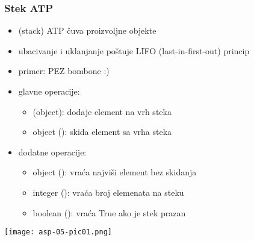 \documentclass[compress,aspectratio=169]{beamer}
\begin{document}
\begin{frame}[fragile]
  \frametitle{Stek ATP}
  \begin{itemize}
    \item {} (stack) ATP čuva proizvoljne objekte
    \item ubacivanje i uklanjanje poštuje LIFO (last-in-first-out) princip
    \item primer: PEZ bombone :)
    \item glavne operacije:
    \begin{itemize}
      \item {}(object): dodaje element na vrh steka
      \item object (): skida element sa vrha steka
    \end{itemize}
    \item dodatne operacije:
    \begin{itemize}
      \item object (): vraća najviši element bez skidanja
      \item integer (): vraća broj elemenata na steku
      \item boolean (): vraća True ako je stek prazan
    \end{itemize}
  \end{itemize}
  \begin{center}
    \texttt{[image: asp-05-pic01.png]}
  \end{center}
\end{frame}
\end{document}
